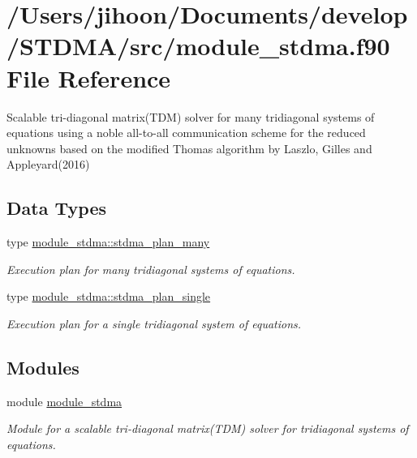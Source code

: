 \hypertarget{module__stdma_8f90}{}\section{/\+Users/jihoon/\+Documents/develop/\+S\+T\+D\+M\+A/src/module\+\_\+stdma.f90 File Reference}
\label{module__stdma_8f90}


Scalable tri-\/diagonal matrix(\+T\+D\+M) solver for many tridiagonal systems of equations using a noble all-\/to-\/all communication scheme for the reduced unknowns based on the modified Thomas algorithm by Laszlo, Gilles and Appleyard(2016)  


\subsection*{Data Types}
\begin{DoxyCompactItemize}
\item 
type \mbox{\hyperlink{structmodule__stdma_1_1stdma__plan__many}{module\+\_\+stdma\+::stdma\+\_\+plan\+\_\+many}}
\begin{DoxyCompactList}\small\item\em Execution plan for many tridiagonal systems of equations. \end{DoxyCompactList}\item 
type \mbox{\hyperlink{structmodule__stdma_1_1stdma__plan__single}{module\+\_\+stdma\+::stdma\+\_\+plan\+\_\+single}}
\begin{DoxyCompactList}\small\item\em Execution plan for a single tridiagonal system of equations. \end{DoxyCompactList}\end{DoxyCompactItemize}
\subsection*{Modules}
\begin{DoxyCompactItemize}
\item 
module \mbox{\hyperlink{namespacemodule__stdma}{module\+\_\+stdma}}
\begin{DoxyCompactList}\small\item\em Module for a scalable tri-\/diagonal matrix(\+T\+D\+M) solver for tridiagonal systems of equations. \end{DoxyCompactList}\end{DoxyCompactItemize}
